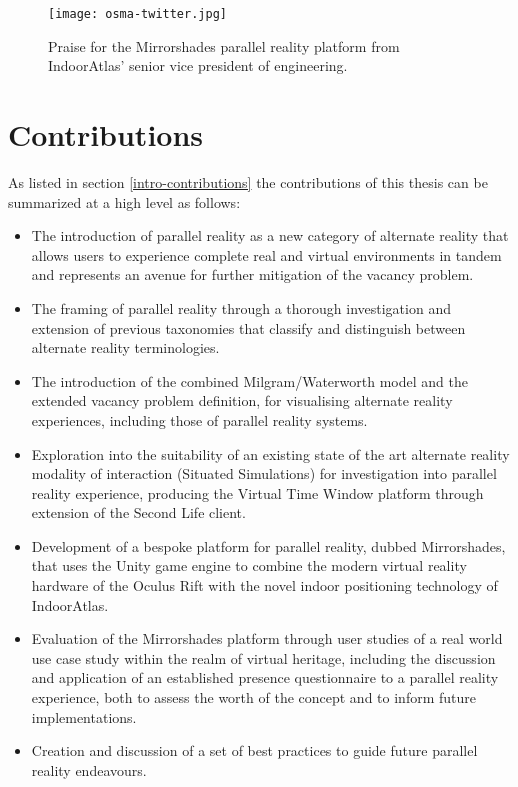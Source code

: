 \begin{figure}[t]
	\begin{center}
		\texttt{[image: osma-twitter.jpg]}
		\caption{Praise for the Mirrorshades parallel reality platform from IndoorAtlas' senior vice president of engineering.}
		\label{osma-twitter.jpg}
	\end{center}	
\end{figure}


\section{Contributions}

As listed in section \ref{intro-contributions} the contributions of this thesis can be summarized at a high level as follows:

\begin{itemize}
	\item The introduction of parallel reality as a new category of alternate reality that allows users to experience complete real and virtual environments in tandem and represents an avenue for further mitigation of the vacancy problem.
	\item The framing of parallel reality through a thorough investigation and extension of previous taxonomies that classify and distinguish between alternate reality terminologies.
	\item The introduction of the combined Milgram/Waterworth model and the extended vacancy problem definition, for visualising alternate reality experiences, including those of parallel reality systems.
	\item Exploration into the suitability of an existing state of the art alternate reality modality of interaction (Situated Simulations) for investigation into parallel reality experience, producing the Virtual Time Window platform through extension of the Second Life client.
	\item Development of a bespoke platform for parallel reality, dubbed Mirrorshades, that uses the Unity game engine to combine the modern virtual reality hardware of the Oculus Rift with the novel indoor positioning technology of IndoorAtlas.
	\item Evaluation of the Mirrorshades platform through user studies of a real world use case study within the realm of virtual heritage, including the discussion and application of an established presence questionnaire to a parallel reality experience, both to assess the worth of the concept and to inform future implementations.
	\item Creation and discussion of a set of best practices to guide future parallel reality endeavours.
\end{itemize}


